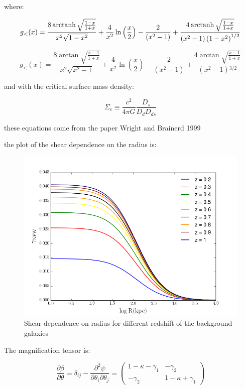 where: 

\begin{equation}
g_{<}(x)=\frac{8 \operatorname{arctanh} \sqrt{\frac{1-x}{1+x}}}{x^{2}\sqrt{1-x^{2}}}+\frac{4}{x^{2}} \ln \left(\frac{x}{2}\right)-\frac{2}{\left(x^{2}-1\right)}+\frac{4 \operatorname{arctanh} \sqrt{\frac{1-x}{1+x}}}{\left(x^{2}-1\right)\left(1-x^{2}\right)^{1/2}}
\end{equation}

\begin{equation}
g_{<}(x)=\frac{8 \arctan \sqrt{\frac{x-1}{1+x}}}{x^{2}\sqrt{x^{2}-1}}+\frac{4}{x^{2}}\ln \left(\frac{x}{2}\right)-\frac{2}{\left(x^{2}-1\right)}+\frac{4 \arctan \sqrt{\frac{x-1}{1+x}}}{\left(x^{2}-1\right){}^{3/2}}
\end{equation} 

and with the critical surface mass density:

\begin{equation}
\Sigma_{c}\equiv\frac{c^{2}}{4\pi G}\frac{D_{s}}{D_{d}D_{ds}}
\end{equation}

these equations come from the paper Wright and Brainerd 1999

the plot of the shear dependence on the radius is:

\begin{figure}[H]
\centering
\includegraphics[width=12cm]{images/Shear_vs_rad.png}
\caption[Shear dependence on radius]{Shear dependence on radius for different redshift of the background galaxies}
\end{figure}

The magnification tensor is:

\begin{equation}
\frac{\partial\beta}{\partial\theta}=\delta_{ij}-\frac{\partial^{2}\psi}{\partial\theta_{i}\partial\theta_{j}}=\left(\begin{array}{cc}
1-\kappa-\gamma_{1} & -\gamma_{2}\\
-\gamma_{2} & 1-\kappa+\gamma_{1}
\end{array}\right)
\end{equation}

